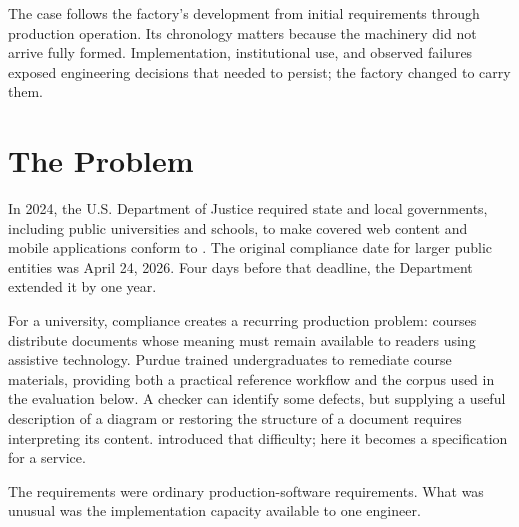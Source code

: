 The case follows the factory's development from initial requirements through production operation. Its chronology matters because the machinery did not arrive fully formed. Implementation, institutional use, and observed failures exposed engineering decisions that needed to persist; the factory changed to carry them.

\section{The Problem}\label{heading:nearly-free}



In 2024, the U.S. Department of Justice required state and local governments, including public universities and schools, to make covered web content and mobile applications conform to \citep{doj-web-accessibility-2024}. The original compliance date for larger public entities was April 24, 2026. Four days before that deadline, the Department extended it by one year\citep{doj2026extension}.


For a university, compliance creates a recurring production problem: courses distribute documents whose meaning must remain available to readers using assistive technology. Purdue trained undergraduates to remediate course materials, providing both a practical reference workflow and the corpus used in the evaluation below. A checker can identify some defects, but supplying a useful description of a diagram or restoring the structure of a document requires interpreting its content.  introduced that difficulty; here it becomes a specification for a service.

The requirements were ordinary production-software requirements. What was unusual was the implementation capacity available to one engineer.



